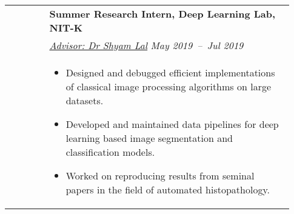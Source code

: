 \documentclass[letterpaper, 10pt, oneside]{article}
\newcommand{\bdit}[1]{{\textbf{#1}}}
\begin{document}
\begin{longtable}{@{} p{0.13\linewidth} p{0.8\linewidth}}
                         & \bdit{Summer Research Intern, Deep Learning Lab, NIT-K}                                                                                                                                                                       \\
                         & \textsl{\href{https://ece.nitk.ac.in/faculty/shyam-lal}{Advisor: Dr Shyam Lal}} \hfill \hspace{-3em} \textsl{May 2019\ --\ Jul 2019}                                                                                          \\
                         & \parbox{0.8\textwidth}{                                                                                                                                                                                                       %
        \begin{itemize}[leftmargin=*, itemsep=-0.88ex, topsep=-0.88ex]
            \item Designed and debugged efficient implementations of classical image processing algorithms on large datasets.
            \item Developed and maintained data pipelines for deep learning based image segmentation and classification models.
            \item Worked on reproducing results from seminal papers in the field of automated histopathology.
        \end{itemize}
    }
    \\
    \\


\end{longtable}
\end{document}
